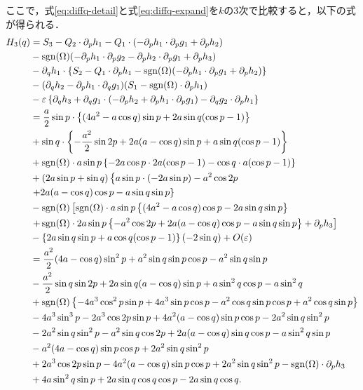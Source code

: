 \documentclass[../main]{subfiles}
\begin{document}
    ここで，式\eqref{eq:diffq-detail}と式\eqref{eq:diffq-expand}を$k$の3次で比較すると，以下の式が得られる． 
    \begin{align}
        H_3(q)&=S_3-Q_2\cdot\partial_ph_1-Q_1\cdot\left(-\partial_ph_1\cdot\partial_pg_1+\partial_ph_2\right)\notag\\
        &-\operatorname{sgn}(\Omega)(-\partial_ph_1\cdot\partial_pg_2-\partial_ph_2\cdot\partial_pg_1+\partial_ph_3)\notag\\
        &-\partial_qh_1\cdot\left\{S_2-Q_1\cdot\partial_ph_1-\operatorname{sgn}(\Omega) (-\partial_ph_1\cdot\partial_pg_1+\partial_ph_2)\right\}\notag\\
        &-(\partial_qh_2-\partial_ph_1\cdot\partial_qg_1)(S_1-\operatorname{sgn}(\Omega)\cdot\partial_ph_1)\notag\\
        &-\varepsilon\left\{\partial_qh_3+\partial_qg_1\cdot(-\partial_ph_2+\partial_ph_1\cdot\partial_pg_1)-\partial_qg_2\cdot\partial_ph_1\right\}\\
        &=\frac{a}{2}\sin p\cdot \left\{(4a^2-a\cos q)\sin p+2a\sin q(\cos p-1)\right\}\notag\\
        &+\sin q\cdot\left\{-\frac{a^2}{2}\sin 2p +2a(a-\cos q)\sin p+a\sin q(\cos p-1)\right\}\notag\\
        &+\operatorname{sgn}(\Omega)\cdot a\sin p\left\{-2a\cos p\cdot 2a(\cos p-1)-\cos q\cdot a(\cos p-1)\right\}\notag\\
        &+(2a\sin p+\sin q)\left\{a\sin p\cdot(-2a\sin p)-a^2\cos 2p \right.\notag\\
        &\left.+2a(a-\cos q)\cos p-a\sin q\sin p\right\}\notag\\
        &-\operatorname{sgn}(\Omega) \left[\operatorname{sgn}(\Omega)\cdot a\sin p\left\{(4a^2-a\cos q)\cos p-2a\sin q\sin p\right\}\right.\notag\\
        &\left.+\operatorname{sgn}(\Omega) \cdot 2a\sin p\left\{-a^2\cos 2p +2a(a-\cos q)\cos p-a\sin q\sin p\right\}+\partial_p h_3\right]\notag\\
        &-\left\{2a\sin q\sin p+a\cos q(\cos p-1)\right\}(-2\sin q)+O(\varepsilon)\\
        &=\frac{a^2}{2}(4a-\cos q)\sin^2 p+a^2\sin q\sin p\cos p-a^2\sin q\sin p\notag\\
        &-\frac{a^2}{2}\sin q\sin 2p+2a\sin q(a-\cos q)\sin p+a\sin^2 q\cos p-a\sin^2 q\notag\\
        &+\operatorname{sgn}(\Omega) \left\{-4a^3\cos^2 p\sin p+4a^3\sin p\cos p-a^2\cos q\sin p\cos p+a^2\cos q\sin p\right\}\notag\\
        &-4a^3\sin^3 p-2a^3\cos 2p\sin p+4a^2(a-\cos q)\sin p\cos p-2a^2\sin q\sin^2 p\notag\\
        &-2a^2\sin q\sin^2 p-a^2\sin q\cos 2p+2a(a-\cos q)\sin q\cos p-a\sin^2 q\sin p\notag\\
        &-a^2(4a-\cos q)\sin p\cos p+2a^2\sin q\sin^2 p\notag\\
        &+2a^3\cos 2p\sin p-4a^2(a-\cos q)\sin p\cos p+2a^2\sin q\sin^2 p-\operatorname{sgn}(\Omega) \cdot\partial_ph_3\notag\\
        &+4a\sin^2 q\sin p+2a\sin q\cos q\cos p-2a\sin q\cos q.
    \end{align}
\end{document}
